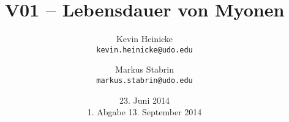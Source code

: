\documentclass[%
    a4paper,%
    twoside,%
    BCOR12mm,%
    DIV13,%
    bibtotoc,%
    openany,%
]{scrartcl}
\title{%
        V01 -- Lebensdauer von Myonen
    }
\author{%
        Kevin Heinicke\\
        \texttt{kevin.heinicke@udo.edu}
        \and
        Markus Stabrin\\
        \texttt{markus.stabrin@udo.edu}
    }
\date{
        23. Juni 2014\\
        {\small 1. Abgabe} 13. September 2014
    }
\begin{document}
    \maketitle%
    \tableofcontents
    \newpage

    
    

    \FloatBarrier
    
    
\end{document}
